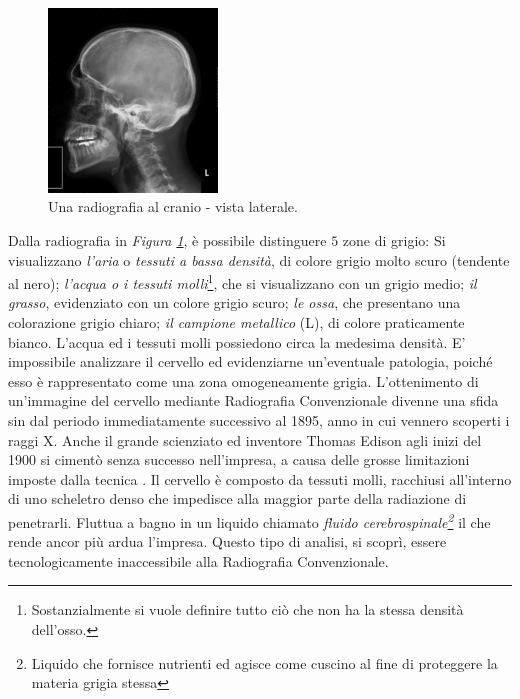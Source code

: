 \documentclass[a4paper,12pt, doubleside]{report}
\begin{document}
                    \begin{figure}[h]
                        \centering
                        \includegraphics[width=0.4\textwidth]{radiografia}
                        \caption{Una radiografia al cranio - vista laterale.}
                        \label{fig:skull}
                    \end{figure}
                        
                \bigskip
                \par
                    Dalla radiografia in \textit{Figura \ref{fig:skull}}, è possibile distinguere $5$ zone di grigio: Si visualizzano \textit{l'aria} o \textit{tessuti a bassa densità}, di colore grigio molto scuro (tendente al nero); \textit{l'acqua o i tessuti molli}\footnote{Sostanzialmente si vuole definire tutto ciò che non ha la stessa densità dell'osso.}, che si visualizzano con un grigio medio; \textit{il grasso}, evidenziato con un colore grigio scuro; \textit{le ossa}, che presentano una colorazione grigio chiaro; \textit{il campione metallico} (L), di colore praticamente bianco. L’acqua ed i tessuti molli possiedono circa la medesima densità. E' impossibile analizzare il cervello ed evidenziarne un'eventuale patologia, poiché esso è rappresentato come una zona omogeneamente grigia. L'ottenimento di un'immagine del cervello mediante Radiografia Convenzionale divenne una sfida sin dal periodo immediatamente successivo al 1895, anno in cui vennero scoperti i raggi X. Anche il grande scienziato ed inventore Thomas Edison agli inizi del 1900 si cimentò senza successo nell'impresa, a causa delle grosse limitazioni imposte dalla tecnica \cite{thomas-edison-brain}. Il cervello è composto da tessuti molli, racchiusi all’interno di uno scheletro denso che impedisce alla maggior parte della radiazione di penetrarli. Fluttua a bagno in un liquido chiamato \textit{fluido cerebrospinale\footnote{Liquido che fornisce nutrienti ed agisce come cuscino al fine di proteggere la materia grigia stessa}} il che rende ancor più ardua l'impresa. Questo tipo di analisi, si scoprì, essere tecnologicamente inaccessibile alla Radiografia Convenzionale.
                
\end{document}
